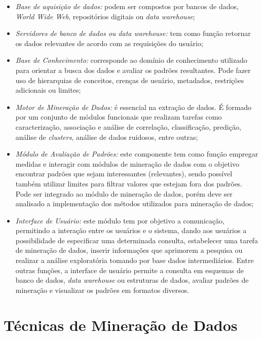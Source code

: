 \begin{itemize}
	\item \textit{Base de aquisição de dados:} podem ser compostos por bancos de dados, \textit{World Wide Web}, repositórios digitais ou \textit{data warehouse};
	
	\item \textit{Servidores de banco de dados ou data warehouse:} tem como função retornar os dados relevantes de acordo com as requisições do usuário;
	
	\item \textit{Base de Conhecimento:} corresponde ao domínio de conhecimento utilizado para orientar a busca dos dados e avaliar os padrões resultantes. Pode fazer uso de hierarquias de conceitos, crenças de usuário, metadados, restrições adicionais ou limites;
	
	\item \textit{Motor de Mineração de Dados:} é essencial na extração de dados. É formado por um conjunto de módulos funcionais que realizam tarefas como caracterização, associação e análise de correlação, classificação, predição, análise de \textit{clusters}, análise de dados ruidosos, entre outras;
	
	\item \textit{Módulo de Avaliação de Padrões:} este componente tem como função empregar medidas e interagir com módulos de mineração de dados com o objetivo encontrar padrões que sejam interessantes (relevantes), sendo possível também utilizar limites para filtrar valores que estejam fora dos padrões. Pode ser integrado ao módulo de mineração de dados, porém deve ser analisado a implementação dos métodos utilizados para mineração de dados;
	
	\item \textit{Interface de Usuário:} este módulo tem por objetivo a comunicação, permitindo a interação entre os usuários e o sistema, dando aos usuários a possibilidade de especificar uma determinada consulta, estabelecer uma tarefa de mineração de dados, inserir informações que aprimorem a pesquisa ou realizar a análise exploratória tomando por base dados intermediários. Entre outras funções, a interface de usuário permite
	a consulta em esquemas de banco de dados, \textit{data warehouse} ou estruturas de dados, avaliar padrões de mineração e visualizar os padrões em formatos diversos.
\end{itemize}

\section{Técnicas de Mineração de Dados} \label{3title3}

